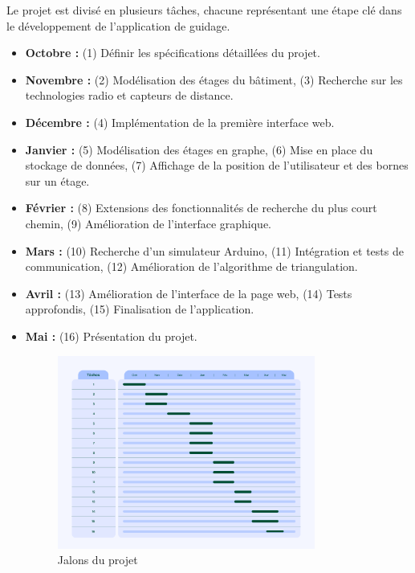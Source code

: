 \documentclass{article}
\begin{document}
Le projet est divisé en plusieurs tâches, chacune représentant une étape clé dans le développement de l'application de guidage.

\begin{itemize}
    \item \textbf{Octobre :} (1) Définir les spécifications détaillées du projet.
    \item \textbf{Novembre :} (2) Modélisation des étages du bâtiment, (3) Recherche sur les technologies radio et capteurs de distance.
    \item \textbf{Décembre :} (4) Implémentation de la première interface web.
    \item \textbf{Janvier :} (5) Modélisation des étages en graphe, (6) Mise en place du stockage de données, (7) Affichage de la position de l’utilisateur et des bornes sur un étage.
    \item \textbf{Février :} (8) Extensions des fonctionnalités de recherche du plus court chemin, (9) Amélioration de l'interface graphique.
    \item \textbf{Mars :} (10) Recherche d'un simulateur Arduino, (11) Intégration et tests de communication, (12) Amélioration de l'algorithme de triangulation.
    \item \textbf{Avril :} (13) Amélioration de l’interface de la page web, (14) Tests approfondis, (15) Finalisation de l'application.
    \item \textbf{Mai :} (16) Présentation du projet.
    
 
\begin{figure}[h!]
    \centering
    \includegraphics[width=0.8\textwidth]{Jalon.png}
    \caption{Jalons du projet}
    \label{fig:jalons}
\end{figure}

\end{itemize}
\end{document}
